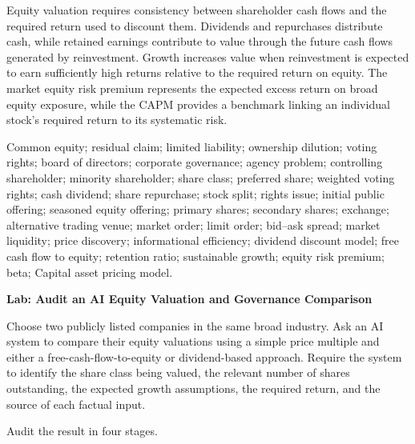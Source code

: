 Equity valuation requires consistency between shareholder cash flows and the required return used to discount them. Dividends and repurchases distribute cash, while retained earnings contribute to value through the future cash flows generated by reinvestment. Growth increases value when reinvestment is expected to earn sufficiently high returns relative to the required return on equity. The market equity risk premium represents the expected excess return on broad equity exposure, while the CAPM provides a benchmark linking an individual stock's required return to its systematic risk.



Common equity; residual claim; limited liability; ownership dilution; voting rights; board of directors; corporate governance; agency problem; controlling shareholder; minority shareholder; share class; preferred share; weighted voting rights; cash dividend; share repurchase; stock split; rights issue; initial public offering; seasoned equity offering; primary shares; secondary shares; exchange; alternative trading venue; market order; limit order; bid--ask spread; market liquidity; price discovery; informational efficiency; dividend discount model; free cash flow to equity; retention ratio; sustainable growth; equity risk premium; beta; Capital asset pricing model.



\textbf{Lab: Audit an AI Equity Valuation and Governance Comparison}

Choose two publicly listed companies in the same broad industry. Ask an AI system to compare their equity valuations using a simple price multiple and either a free-cash-flow-to-equity or dividend-based approach. Require the system to identify the share class being valued, the relevant number of shares outstanding, the expected growth assumptions, the required return, and the source of each factual input.

Audit the result in four stages.

